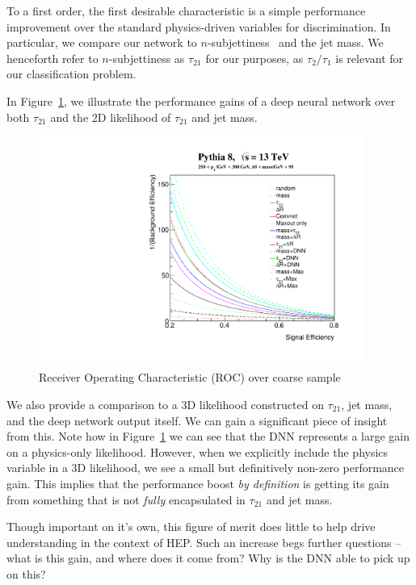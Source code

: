 To a first order, the first desirable characteristic is a simple performance improvement over the standard physics-driven variables for discrimination. In particular, we compare our network to $n$-subjettiness~\cite{nsub} and the jet mass. We henceforth refer to $n$-subjettiness as $\tau_{21}$ for our purposes, as $\tau_{2}/\tau_{1}$ is relevant for our classification problem.

In Figure~\ref{fig:combinedROC}, we illustrate the performance gains of a deep neural network over both $\tau_{21}$ and the 2D likelihood of $\tau_{21}$ and jet mass. 


\begin{figure}[!htbp]
  \centering
  \includegraphics[width=0.95\textwidth]{figures/ROCs}
  \caption{Receiver Operating Characteristic (ROC) over coarse sample}
  \label{fig:combinedROC}
\end{figure}

We also provide a comparison to a 3D likelihood constructed on $\tau_{21}$, jet mass, and the deep network output itself. We can gain a significant piece of insight from this. Note how in Figure~\ref{fig:combinedROC} we can see that the DNN represents a large gain on a physics-only likelihood. However, when we explicitly include the physics variable in a 3D likelihood, we see a small but definitively non-zero performance gain. This implies that the performance boost \emph{by definition} is getting its gain from something that is not \emph{fully} encapsulated in $\tau_{21}$ and jet mass. 

Though important on it's own, this figure of merit does little to help drive understanding in the context of HEP. Such an increase begs further questions -- what is this gain, and where does it come from? Why is the DNN able to pick up on this?



